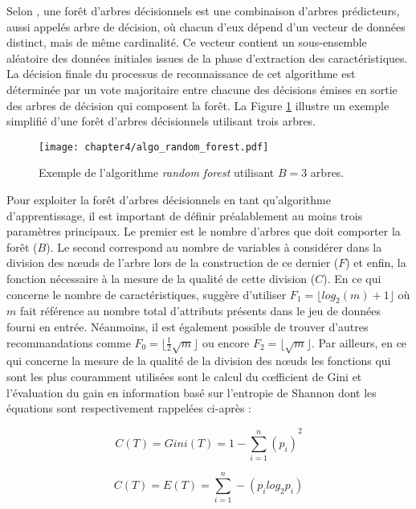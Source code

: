 Selon \cite{Breiman2001}, une forêt d'arbres décisionnels est une combinaison d'arbres prédicteurs, aussi appelés arbre de décision, où chacun d'eux dépend d'un vecteur de données distinct, mais de même cardinalité. Ce vecteur contient un sous-ensemble aléatoire des données initiales issues de la phase d'extraction des caractéristiques. La décision finale du processus de reconnaissance de cet algorithme est déterminée par un vote majoritaire entre chacune des décisions émises en sortie des arbres de décision qui composent la forêt. La Figure \ref{fig:algo_random_forest} illustre un exemple simplifié d'une forêt d'arbres décisionnels utilisant trois arbres.

\begin{figure}[H]
	\centering
	\texttt{[image: chapter4/algo\_random\_forest.pdf]}
        \caption{Exemple de l'algorithme \textit{random forest} utilisant $B=3$ arbres.}
	\label{fig:algo_random_forest}
\end{figure}

Pour exploiter la forêt d'arbres décisionnels en tant qu'algorithme d'apprentissage, il est important de définir préalablement au moins trois paramètres principaux. Le premier est le nombre d'arbres que doit comporter la forêt ($B$). Le second correspond au nombre de variables à considérer dans la division des n\oe{}uds de l'arbre lors de la construction de ce dernier ($F$) et enfin, la fonction nécessaire à la mesure de la qualité de cette division ($C$). En ce qui concerne le nombre de caractéristiques, \citeauthor{Breiman2001} suggère d'utiliser $F_1=\lfloor log_2(m) + 1\rfloor$ où $m$ fait référence au nombre total d'attributs présents dans le jeu de données fourni en entrée. Néanmoins, il est également possible de trouver d'autres recommandations comme $F_0=\lfloor \frac{1}{2}\sqrt{m}\rfloor$ ou encore $F_2=\lfloor \sqrt{m}\rfloor$. Par ailleurs, en ce qui concerne la mesure de la qualité de la division des n\oe{}uds les fonctions qui sont les plus couramment utilisées sont le calcul du c\oe{}fficient de Gini et l'évaluation du gain en information basé sur l'entropie de Shannon dont les équations sont respectivement rappelées ci-après :

\begin{equation}
	\label{eq:gini}
	C(T) = Gini(T) = {1-\sum_{i=1}^{n}(p_i)}^2
\end{equation}

\begin{equation}
	\label{eq:gain}
	C(T) = E(T) = \sum_{i=1}^{n}-(p_i log_2 p_i)
\end{equation}

